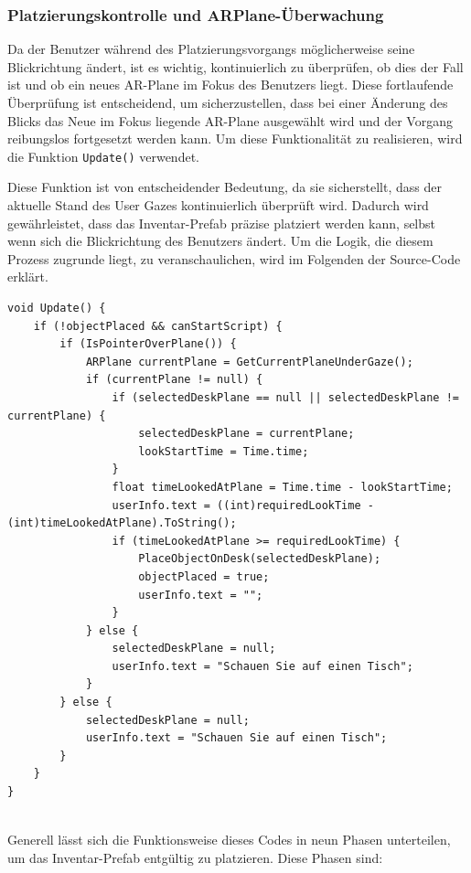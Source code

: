 \subsubsection{Platzierungskontrolle und ARPlane-Überwachung}
Da der Benutzer während des Platzierungsvorgangs möglicherweise seine Blickrichtung ändert, ist es wichtig, kontinuierlich
zu überprüfen, ob dies der Fall ist und ob ein neues AR-Plane im Fokus des Benutzers liegt. Diese fortlaufende Überprüfung
ist entscheidend, um sicherzustellen, dass bei einer Änderung des Blicks das Neue im Fokus liegende AR-Plane ausgewählt
wird und der Vorgang reibungslos fortgesetzt werden kann. Um diese Funktionalität zu realisieren, wird die Funktion \texttt{Update()} verwendet.

Diese Funktion ist von entscheidender Bedeutung, da sie sicherstellt, dass der aktuelle Stand des User Gazes kontinuierlich
überprüft wird. Dadurch wird gewährleistet, dass das Inventar-Prefab präzise platziert werden kann, selbst wenn sich die
Blickrichtung des Benutzers ändert. Um die Logik, die diesem Prozess zugrunde liegt, zu veranschaulichen, wird im Folgenden
der Source-Code erklärt.
\begin{lstlisting}[caption={Funktion um Usergaze zu verwenden}, label=code:isPOP]
void Update() {
    if (!objectPlaced && canStartScript) {
        if (IsPointerOverPlane()) {
            ARPlane currentPlane = GetCurrentPlaneUnderGaze();
            if (currentPlane != null) {
                if (selectedDeskPlane == null || selectedDeskPlane != currentPlane) {
                    selectedDeskPlane = currentPlane;
                    lookStartTime = Time.time;
                }
                float timeLookedAtPlane = Time.time - lookStartTime;
                userInfo.text = ((int)requiredLookTime - (int)timeLookedAtPlane).ToString();
                if (timeLookedAtPlane >= requiredLookTime) {
                    PlaceObjectOnDesk(selectedDeskPlane);
                    objectPlaced = true;
                    userInfo.text = "";
                }
            } else {
                selectedDeskPlane = null;
                userInfo.text = "Schauen Sie auf einen Tisch";
            }
        } else {
            selectedDeskPlane = null;
            userInfo.text = "Schauen Sie auf einen Tisch";
        }
    }
}
\end{lstlisting}\\
Generell lässt sich die Funktionsweise dieses Codes in neun Phasen unterteilen, um das Inventar-Prefab entgültig zu platzieren.
Diese Phasen sind:

